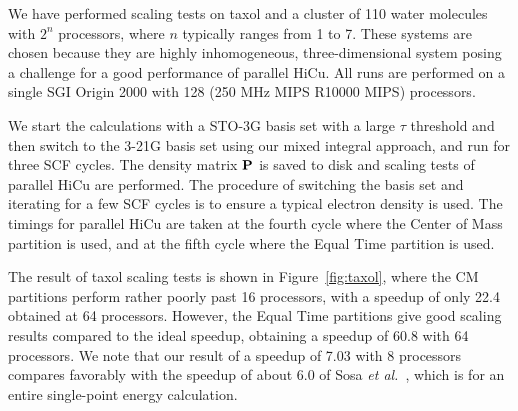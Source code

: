 \commentoutA{\documentclass[prb,aps,twocolumn,twocolumngrid]{revtex4}}
\begin{document}

We have performed scaling tests on taxol and a cluster of 110 water
molecules with $2^n$ processors, where $n$ typically ranges from 1 to
7.  These systems are chosen because they are highly inhomogeneous,
three-dimensional system posing a challenge for a good performance of
parallel HiCu.  All runs are performed on a single SGI Origin 2000
with 128 (250 MHz MIPS R10000 MIPS) processors.

We start the calculations with a STO-3G basis set with a large $\tau$
threshold and then switch to the 3-21G basis set using our mixed
integral approach, and run for three SCF cycles.  The density matrix
${\bf P}$ is saved to disk and scaling tests of parallel HiCu are
performed.  The procedure of switching the basis set and iterating for
a few SCF cycles is to ensure a typical electron density is used. The
timings for parallel HiCu are taken at the fourth cycle where the
Center of Mass partition is used, and at the fifth cycle where the
Equal Time partition is used.

The result of taxol scaling tests is shown in Figure~\ref{fig:taxol},
where the CM partitions perform rather poorly past 16 processors, with
a speedup of only 22.4 obtained at 64 processors.  However, the Equal
Time partitions give good scaling results compared to the ideal
speedup, obtaining a speedup of 60.8 with 64 processors.  We note that
our result of a speedup of 7.03 with 8 processors compares favorably
with the speedup of about 6.0 of Sosa {\it et al.}~\cite{Sosa_00v26},
which is for an entire single-point energy calculation.
\end{document}
